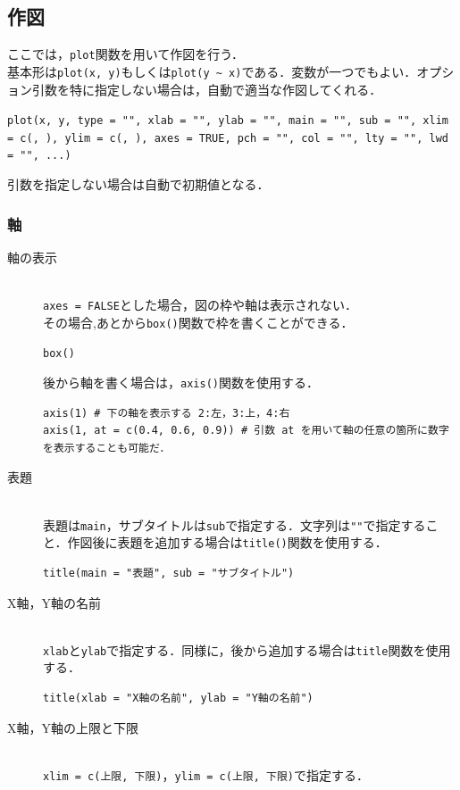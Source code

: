 \subsection{作図}
ここでは，{\tt plot}関数を用いて作図を行う．\\
基本形は{\tt plot(x, y)}もしくは{\tt plot(y \verb+~+ x)}である．変数が一つでもよい．オプション引数を特に指定しない場合は，自動で適当な作図してくれる．
\begin{screen}
\verb+plot(x, y, type = "", xlab = "", ylab = "", main = "", sub = "", xlim = c(, ), ylim = c(, ), axes = TRUE, pch = "", col = "", lty = "", lwd = "", ...)+ 
\end{screen}
引数を指定しない場合は自動で初期値となる．
\subsubsection{軸}
\begin{description}
\item[軸の表示] \mbox{}\\
{\tt axes = FALSE}とした場合，図の枠や軸は表示されない．\\
その場合,あとから{\tt box()}関数で枠を書くことができる．
\begin{screen}
{\tt box()}
\end{screen}
後から軸を書く場合は，{\tt axis()}関数を使用する．
\begin{screen}
\begin{verbatim}
axis(1) # 下の軸を表示する 2:左，3:上，4:右
axis(1, at = c(0.4, 0.6, 0.9)) # 引数 at を用いて軸の任意の箇所に数字を表示することも可能だ．
\end{verbatim}
\end{screen}
\item[表題] \mbox{}\\
表題は{\tt main}，サブタイトルは{\tt sub}で指定する．文字列は\verb+""+で指定すること．作図後に表題を追加する場合は{\tt title()}関数を使用する．
\begin{screen}
\begin{verbatim}
title(main = "表題", sub = "サブタイトル")
\end{verbatim}
\end{screen}
\item[X軸，Y軸の名前] \mbox{}\\
{\tt xlab}と{\tt ylab}で指定する．同様に，後から追加する場合は{\tt title}関数を使用する．
\begin{screen}
\begin{verbatim}
title(xlab = "X軸の名前", ylab = "Y軸の名前")
\end{verbatim}
\end{screen}
\item[X軸，Y軸の上限と下限] \mbox{}\\
{\tt xlim = c(上限, 下限)}，{\tt ylim = c(上限, 下限)}で指定する．
\end{description}

